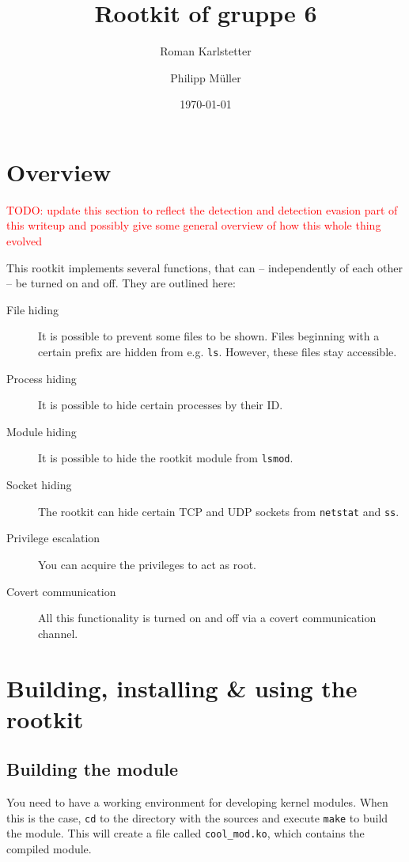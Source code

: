 \documentclass[10pt, letterpaper]{article}
\title{Rootkit of gruppe 6}
\author{Roman Karlstetter \and Philipp M\"uller}
\date{\today}
\newcommand{\todo}[1]{\textcolor{red}{TODO: #1}}
\begin{document}
\maketitle

\section{Overview}
\todo{update this section to reflect the detection and detection evasion part of this writeup and possibly give some general overview of how this whole thing evolved}


This rootkit implements several functions, that can -- independently of each other -- be turned on and off. They are outlined here:

\begin{description}
\item [File hiding] It is possible to prevent some files to be shown. Files beginning with a certain prefix are hidden from e.g. \texttt{ls}. However, these files stay accessible.
\item [Process hiding] It is possible to hide certain processes by their ID.
\item [Module hiding] It is possible to hide the rootkit module from \texttt{lsmod}.
\item [Socket hiding] The rootkit can hide certain TCP and UDP sockets from \texttt{netstat} and \texttt{ss}.
\item [Privilege escalation] You can acquire the privileges to act as root.
\item [Covert communication] All this functionality is turned on and off via a covert communication channel.
\end{description}

\section{Building, installing \& using the rootkit}

\subsection{Building the module}

You need to have a working environment for developing kernel modules. When this is the case, \texttt{cd} to the directory with the sources and execute \texttt{make} to build the module. This will create a file called \texttt{cool\_mod.ko}, which contains the compiled module.
\end{document}
